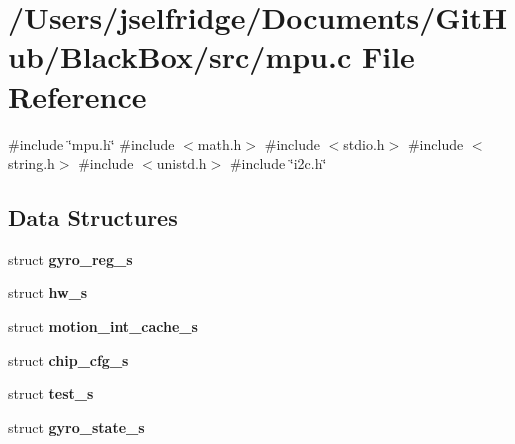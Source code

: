 \section{/\+Users/jselfridge/\+Documents/\+Git\+Hub/\+Black\+Box/src/mpu.c File Reference}
\label{mpu_8c}
{\ttfamily \#include \char`\"{}mpu.\+h\char`\"{}}\newline
{\ttfamily \#include $<$math.\+h$>$}\newline
{\ttfamily \#include $<$stdio.\+h$>$}\newline
{\ttfamily \#include $<$string.\+h$>$}\newline
{\ttfamily \#include $<$unistd.\+h$>$}\newline
{\ttfamily \#include \char`\"{}i2c.\+h\char`\"{}}\newline
\subsection*{Data Structures}
\begin{DoxyCompactItemize}
\item 
struct \textbf{ gyro\+\_\+reg\+\_\+s}
\item 
struct \textbf{ hw\+\_\+s}
\item 
struct \textbf{ motion\+\_\+int\+\_\+cache\+\_\+s}
\item 
struct \textbf{ chip\+\_\+cfg\+\_\+s}
\item 
struct \textbf{ test\+\_\+s}
\item 
struct \textbf{ gyro\+\_\+state\+\_\+s}
\end{DoxyCompactItemize}
